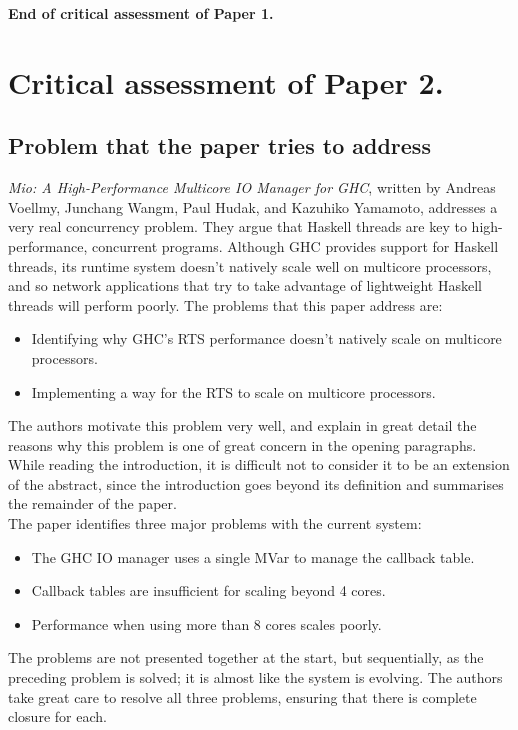 \documentclass[9pt]{report}
\begin{document}
\noindent
{\bf End of critical assessment of Paper 1.}
\clearpage

\section*{Critical assessment of Paper 2.}
\subsection*{Problem that the paper tries to address}
{\it Mio: A High-Performance Multicore IO Manager for GHC}, written by Andreas Voellmy, Junchang Wangm, Paul Hudak, and Kazuhiko Yamamoto, addresses a very real concurrency problem.
They argue that Haskell threads are key to high-performance, concurrent programs.
Although GHC provides support for Haskell threads, its runtime system doesn't natively scale well on multicore processors, and so network applications that try to take advantage of lightweight Haskell threads will perform poorly.
The problems that this paper address are:

\begin{itemize}
\item Identifying why GHC's RTS performance doesn't natively scale on multicore processors.
\item Implementing a way for the RTS to scale on multicore processors.
\end{itemize}

\noindent
The authors motivate this problem very well, and explain in great detail the reasons why this problem is one of great concern in the opening paragraphs.
While reading the introduction, it is difficult not to consider it to be an extension of the abstract, since the introduction goes beyond its definition and summarises the remainder of the paper.\\

\noindent
The paper identifies three major problems with the current system:

\begin{itemize}
\item The GHC IO manager uses a single MVar to manage the callback table.
\item Callback tables are insufficient for scaling beyond 4 cores.
\item Performance when using more than 8 cores scales poorly.
\end{itemize}

The problems are not presented together at the start, but sequentially, as the preceding problem is solved; it is almost like the system is evolving.
The authors take great care to resolve all three problems, ensuring that there is complete closure for each.
\end{document}
